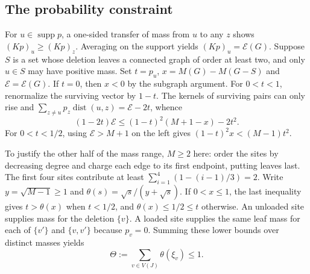 \documentclass[11pt,a4paper]{article}
\theoremstyle{remark}\newtheorem*{remark}{Remark}
\newcommand{\supp}{\operatorname{supp}}
\DeclareMathOperator{\dist}{dist}
\begin{document}
\subsection{The probability constraint}
For $u\in\supp p$, a one-sided transfer of mass from $u$ to any $z$ shows $(Kp)_u\ge(Kp)_z$. Averaging on the support yields $(Kp)_u=\mathcal E(G)$. Suppose $S$ is a set whose deletion leaves a connected graph of order at least two, and only $u\in S$ may have positive mass. Set $t=p_u$, $x=M(G)-M(G-S)$ and $\mathcal E=\mathcal E(G)$. If $t=0$, then $x<0$ by the subgraph argument. For $0<t<1$, renormalize the surviving vector by $1-t$. The kernels of surviving pairs can only rise and $\sum_{z\ne u}p_z\dist(u,z)=\mathcal E-2t$, whence
\[
 (1-2t)\mathcal E\le (1-t)^2(M+1-x)-2t^2 .
\]
For $0<t<1/2$, using $\mathcal E>M+1$ on the left gives $(1-t)^2x<(M-1)t^2$.

To justify the other half of the mass range, $M\ge2$ here: order the sites by decreasing degree and charge each edge to its first endpoint, putting leaves last. The first four sites contribute at least $\sum_{i=1}^4(1-(i-1)/3)=2$. Write $y=\sqrt{M-1}\ge1$ and $\theta(s)=\sqrt s/(y+\sqrt s)$. If $0<x\le1$, the last inequality gives $t>\theta(x)$ when $t<1/2$, and $\theta(x)\le1/2\le t$ otherwise. An unloaded site supplies mass for the deletion $\{v\}$. A loaded site supplies the same leaf mass for each of $\{v'\}$ and $\{v,v'\}$ because $p_v=0$. Summing these lower bounds over distinct masses yields
\begin{equation}
 \Theta:=\sum_{v\in V(J)}\theta(\xi_v)\le1.\label{budget}
\end{equation}
\end{document}

